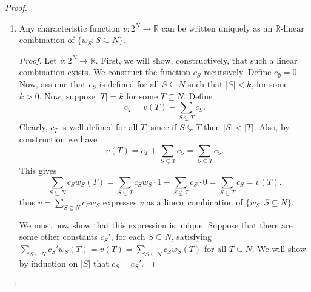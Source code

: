 \documentclass[10pt]{article}
\newcommand{\R}{\mathbb{R}}
\begin{document}
\begin{enumerate}
\begin{proof}
\begin{enumerate}
\begin{proof}
Suppose now that $i,j \in S$.  For all $T$ such that $i,j \not \in T$, $S \not \subseteq T \cup \{i\}$ because $j \not \in T \cup \{i\}$; and $S \not \subseteq T \cup \{j\}$ because $i \not \in T \cup \{j\}$.  Thus, $v(T \cup \{i\}) = v(T \cup \{j\}) = 0$.  So by axiom 2, $\phi_i(cw_S) = \phi_j(cw_S)$.

For any $j \in S$, by axiom 1 we have
$$
|S| \phi_j(cw_S)
=
\sum\limits_{i \in S} \phi_i(cw_S) =
\sum\limits_{i \in S} \phi_i(cw_S) + 0
=
\sum\limits_{i \in S} \phi_i(cw_S) + \sum\limits_{i \not \in S} \phi_i(cw_S)
=
\sum\limits_{i \in N} \phi_i(cw_S)
= c
$$
thus $\phi_j(cw_S) = \dfrac{c}{|S|}$.
\end{proof}
\item Any characteristic function $v: 2^N \rightarrow \R$ can be written uniquely as an $\R$-linear combination of $\{w_S : S \subseteq N\}$.
\begin{proof}
Let $v: 2^N \rightarrow \R$.  First, we will show, constructively, that such a linear combination exists.  We construct the function $c_S$ recursively.  Define $c_{\emptyset} = 0$.  Now, assume that $c_S$ is defined for all $S \subseteq N$ such that $|S| < k$, for some $k > 0$.  Now, suppose $|T| = k$ for some $T \subseteq N$.  Define
$$
c_T = v(T) - \sum\limits_{S \subsetneq T} c_S.
$$
Clearly, $c_T$ is well-defined for all $T$, since if $S \subsetneq T$ then $|S| < |T|$.  Also, by construction we have
$$
v(T) = c_T + \sum\limits_{S \subsetneq T} c_S = \sum\limits_{S \subseteq T} c_S.
$$
This gives
$$
\sum\limits_{S \subseteq N} c_Sw_S(T)
=
\sum\limits_{S \subseteq T} c_Sw_S \cdot 1
+ \sum\limits_{S \not \subseteq T} c_S\cdot 0
=
\sum\limits_{S \subseteq T} c_S = v(T).
$$
thus $v = \sum\limits_{S \subseteq N} c_Sw_S$ expresses $v$ as a linear combination of $\{w_S : S \subseteq N\}$.

We must now show that this expression is unique.  Suppose that there are some other constants $c_S'$, for each $S \subseteq N$, satisfying $\sum\limits_{S \subseteq N} c_S'w_S(T) = v(T) = \sum\limits_{S \subseteq N} c_Sw_S(T)$ for all $T \subseteq N$.  We will show by induction on $|S|$ that $c_S = c_S'$.


\end{proof}
\end{enumerate}
\end{proof}
\end{enumerate}
\end{document}
